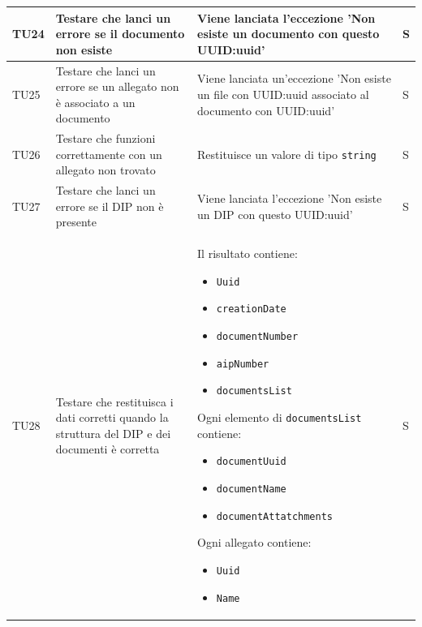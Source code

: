 \documentclass[a4paper,12pt]{article}
\begin{document}
\begin{longtable}{|M{1.2cm}|M{5cm}|M{8cm}|M{1.5cm}|}
            TU24 & Testare che \texttt{} lanci un errore se il documento non esiste & Viene lanciata l'eccezione 'Non esiste un documento con questo UUID:uuid' & S \\
            \hline

            TU25 & Testare che \texttt{} lanci un errore se un allegato non è associato a un documento & Viene lanciata un'eccezione 'Non esiste un file con UUID:uuid associato al documento con UUID:uuid' & S \\
            \hline

            TU26 & Testare che \texttt{} funzioni correttamente con un allegato non trovato & Restituisce un valore di tipo \texttt{string} & S \\
            \hline

            TU27 & Testare che \texttt{} lanci un errore se il DIP non è presente & Viene lanciata l'eccezione 'Non esiste un DIP con questo UUID:uuid' & S \\
            \hline

            TU28 & Testare che \texttt{} restituisca i dati corretti quando la struttura del DIP e dei documenti è corretta & Il risultato contiene:
            \begin{itemize}[leftmargin=*]
                \item \texttt{Uuid}
                \item \texttt{creationDate}
                \item \texttt{documentNumber}
                \item \texttt{aipNumber}
                \item \texttt{documentsList}
            \end{itemize} Ogni elemento di \texttt{documentsList} contiene:
            \begin{itemize}[leftmargin=*]
                \item \texttt{documentUuid}
                \item \texttt{documentName}
                \item \texttt{documentAttatchments}
            \end{itemize} Ogni allegato contiene:
            \begin{itemize}[leftmargin=*]
                \item \texttt{Uuid}
                \item \texttt{Name}
            \end{itemize} & S \\
            \hline


\end{longtable}
\end{document}
